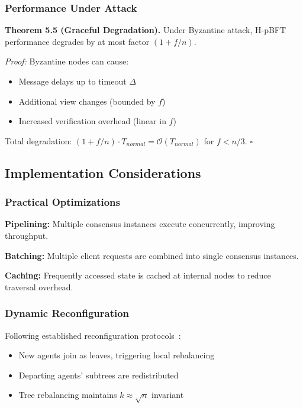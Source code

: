 \documentclass[conference]{IEEEtran}
\newcommand{\bigO}{\mathcal{O}}
\begin{document}
\subsubsection{Performance Under Attack}

\textbf{Theorem 5.5 (Graceful Degradation).} Under Byzantine attack, H-pBFT performance degrades by at most factor $(1 + f/n)$.

\textit{Proof:} Byzantine nodes can cause:
\begin{itemize}
    \item Message delays up to timeout $\Delta$
    \item Additional view changes (bounded by $f$)
    \item Increased verification overhead (linear in $f$)
\end{itemize}

Total degradation: $(1 + f/n) \cdot T_{normal} = \bigO(T_{normal})$ for $f < n/3$. $\square$

\subsection{Implementation Considerations}

\subsubsection{Practical Optimizations}

\textbf{Pipelining:} Multiple consensus instances execute concurrently, improving throughput.

\textbf{Batching:} Multiple client requests are combined into single consensus instances.

\textbf{Caching:} Frequently accessed state is cached at internal nodes to reduce traversal overhead.

\subsubsection{Dynamic Reconfiguration}

Following established reconfiguration protocols~\cite{lamport2019byzantine}:
\begin{itemize}
    \item New agents join as leaves, triggering local rebalancing
    \item Departing agents' subtrees are redistributed
    \item Tree rebalancing maintains $k \approx \sqrt{n}$ invariant
\end{itemize}
\end{document}
